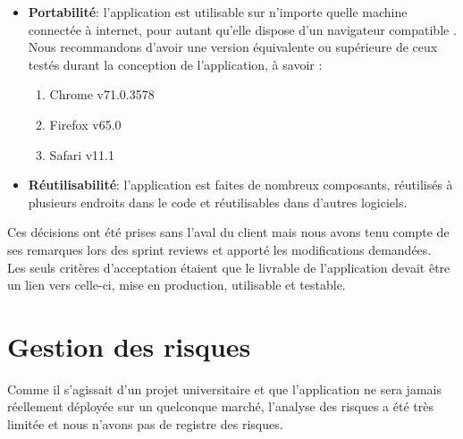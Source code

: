 \documentclass[t, 12pt, usenames,dvipsnames]{article}
\begin{document}
\begin{itemize}
            \item \textbf{Portabilité}: l'application est utilisable sur n'importe quelle machine connectée à internet, pour autant qu'elle dispose d'un navigateur compatible . Nous recommandons d'avoir une version équivalente ou supérieure de ceux testés durant la conception de l'application, à savoir : 
                \begin{enumerate}
                    \item Chrome v71.0.3578
                    \item Firefox v65.0
                    \item Safari v11.1
                \end{enumerate}
            \newpage
            \item \textbf{Réutilisabilité}: l'application est faites de nombreux composants, réutilisés à plusieurs endroits dans le code et réutilisables dans d'autres logiciels.
        \end{itemize}
        
        \noindent Ces décisions ont été prises sans l'aval du client mais nous avons tenu compte de ses remarques lors des sprint reviews et apporté les modifications demandées.\\
        Les seuls critères d'acceptation étaient que le livrable de l'application devait être un lien vers celle-ci, mise en production, utilisable et testable.
        
    

    \newpage

    \section{Gestion des risques}
    \noindent Comme il s'agissait d'un projet universitaire et que l'application ne sera jamais réellement déployée sur un quelconque marché, l'analyse des risques a été très limitée et nous n'avons pas de registre des risques.
    
\end{document}
